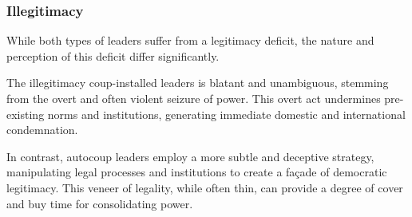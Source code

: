 \documentclass[
  12pt,
]{report}
\begin{document}
\begin{table}

\caption{\label{tbl-leaders}Main features of autocoup and coup-installed
leaders}


\end{table}%

\subsubsection*{Illegitimacy}\label{illegitimacy}

While both types of leaders suffer from a legitimacy deficit, the nature
and perception of this deficit differ significantly.

The illegitimacy coup-installed leaders is blatant and unambiguous,
stemming from the overt and often violent seizure of power. This overt
act undermines pre-existing norms and institutions, generating immediate
domestic and international condemnation.

In contrast, autocoup leaders employ a more subtle and deceptive
strategy, manipulating legal processes and institutions to create a
façade of democratic legitimacy. This veneer of legality, while often
thin, can provide a degree of cover and buy time for consolidating
power.
\end{document}

